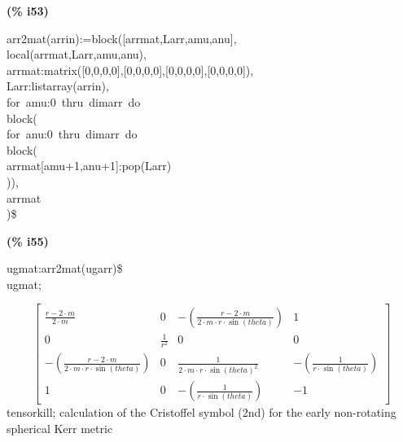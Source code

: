 \documentclass[fleqn]{article}
\begin{document}
\noindent%



\noindent
\begin{minipage}[t]{4.000000em}\color{red}\bfseries
(\% i53)	
\end{minipage}
\begin{minipage}[t]{\textwidth}\color{blue}
arr2mat(arrin):=block([arrmat,Larr,amu,anu],\\
local(arrmat,Larr,amu,anu),\\
arrmat:matrix([0,0,0,0],[0,0,0,0],[0,0,0,0],[0,0,0,0]),\\
Larr:listarray(arrin),\\
for\ amu:0\ thru\ dimarr\ do\\
block(\\
for\ anu:0\ thru\ dimarr\ do\\
block(\\
arrmat[amu+1,anu+1]:pop(Larr)\\
)),\\
arrmat\\
)\$
\end{minipage}

\noindent%



\noindent
\begin{minipage}[t]{4.000000em}\color{red}\bfseries
(\% i55)	
\end{minipage}
\begin{minipage}[t]{\textwidth}\color{blue}
ugmat:arr2mat(ugarr)\$\\
ugmat;
\end{minipage}
\[\displaystyle \tag{\% o55} 
\begin{bmatrix}\frac{r\mathop{-}2\mathop{\ensuremath{\cdot}}m}{2\mathop{\ensuremath{\cdot}}m} & 0 & \mathop{-}\left( \frac{r\mathop{-}2\mathop{\ensuremath{\cdot}}m}{2\mathop{\ensuremath{\cdot}}m\mathop{\ensuremath{\cdot}}r\mathop{\ensuremath{\cdot}}\sin{(theta)}}\right)  & 1\\
0 & \frac{1}{{{r}^{2}}} & 0 & 0\\
\mathop{-}\left( \frac{r\mathop{-}2\mathop{\ensuremath{\cdot}}m}{2\mathop{\ensuremath{\cdot}}m\mathop{\ensuremath{\cdot}}r\mathop{\ensuremath{\cdot}}\sin{(theta)}}\right)  & 0 & \frac{1}{2\mathop{\ensuremath{\cdot}}m\mathop{\ensuremath{\cdot}}r\mathop{\ensuremath{\cdot}}{{\sin{(theta)}}^{2}}} & \mathop{-}\left( \frac{1}{r\mathop{\ensuremath{\cdot}}\sin{(theta)}}\right) \\
1 & 0 & \mathop{-}\left( \frac{1}{r\mathop{\ensuremath{\cdot}}\sin{(theta)}}\right)  & \mathop{-}1\end{bmatrix}\mbox{}
\]
tensorkill;
calculation of the Cristoffel symbol (2nd) for the early non-rotating spherical Kerr metric
\end{document}
